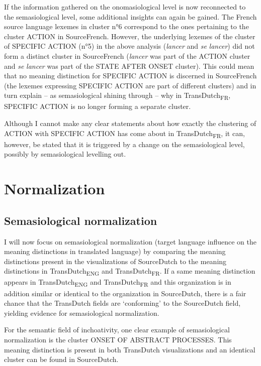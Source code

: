 If the information gathered on the onomasiological level is now reconnected to the semasiological level, some additional insights can again be gained. The French source language lexemes in cluster n°6 correspond to the ones pertaining to the cluster ACTION in SourceFrench. However, the underlying lexemes of the cluster of {SPECIFIC} ACTION (n°5) in the above analysis (\textit{lancer} and \textit{se} \textit{lancer}) did not form a distinct cluster in SourceFrench (\textit{lancer} was part of the ACTION cluster and \textit{se} \textit{lancer} was part of the STATE AFTER ONSET cluster). This could mean that no meaning distinction for {SPECIFIC} ACTION is discerned in SourceFrench (the lexemes expressing {SPECIFIC} ACTION are part of different clusters) and in turn explain – as semasiological shining through – why in TransDutch\textsubscript{FR}, {SPECIFIC} ACTION is no longer forming a separate cluster.

Although I cannot make any clear statements about how exactly the clustering of ACTION with {SPECIFIC} ACTION has come about in TransDutch\textsubscript{FR}, it can, however, be stated that it is triggered by a change on the semasiological level, possibly by semasiological levelling out.

\section{Normalization}
\label{sec:4.7}  
\subsection{Semasiological normalization}
\label{sec:4.7.1}  
I will now focus on semasiological normalization (target language influence on the meaning distinctions in translated language) by comparing the meaning distinctions present in the visualizations of SourceDutch to the meaning distinctions in TransDutch\textsubscript{ENG} and TransDutch\textsubscript{FR}. If a same meaning distinction appears in TransDutch\textsubscript{ENG} and TransDutch\textsubscript{FR} and this organization is in addition similar or identical to the organization in SourceDutch, there is a fair chance that the TransDutch fields are ‘conforming’ to the SourceDutch field, yielding evidence for semasiological normalization.

For the semantic field of inchoativity, one clear example of semasiological normalization is the cluster {ONSET OF ABSTRACT PROCESSES}. This meaning distinction is present in both TransDutch visualizations and an identical cluster can be found in SourceDutch.

